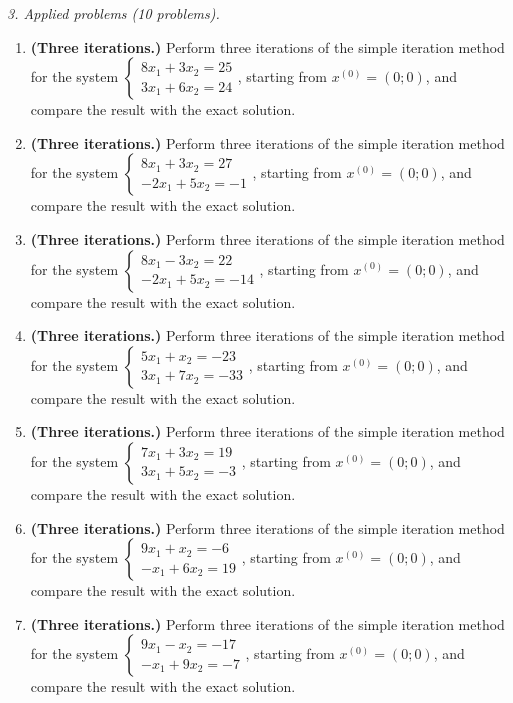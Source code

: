 \emph{3. Applied problems (10 problems).}
\bigskip
\begin{enumerate}[label=\arabic*., leftmargin=*]
\item \textbf{(Three iterations.)} Perform three iterations of the simple iteration method for the system $\begin{cases}8x_1+3x_2=25\\3x_1+6x_2=24\end{cases}$, starting from $x^{(0)}=(0;0)$, and compare the result with the exact solution.
\item \textbf{(Three iterations.)} Perform three iterations of the simple iteration method for the system $\begin{cases}8x_1+3x_2=27\\-2x_1+5x_2=-1\end{cases}$, starting from $x^{(0)}=(0;0)$, and compare the result with the exact solution.
\item \textbf{(Three iterations.)} Perform three iterations of the simple iteration method for the system $\begin{cases}8x_1-3x_2=22\\-2x_1+5x_2=-14\end{cases}$, starting from $x^{(0)}=(0;0)$, and compare the result with the exact solution.
\item \textbf{(Three iterations.)} Perform three iterations of the simple iteration method for the system $\begin{cases}5x_1+x_2=-23\\3x_1+7x_2=-33\end{cases}$, starting from $x^{(0)}=(0;0)$, and compare the result with the exact solution.
\item \textbf{(Three iterations.)} Perform three iterations of the simple iteration method for the system $\begin{cases}7x_1+3x_2=19\\3x_1+5x_2=-3\end{cases}$, starting from $x^{(0)}=(0;0)$, and compare the result with the exact solution.
\item \textbf{(Three iterations.)} Perform three iterations of the simple iteration method for the system $\begin{cases}9x_1+x_2=-6\\-x_1+6x_2=19\end{cases}$, starting from $x^{(0)}=(0;0)$, and compare the result with the exact solution.
\item \textbf{(Three iterations.)} Perform three iterations of the simple iteration method for the system $\begin{cases}9x_1-x_2=-17\\-x_1+9x_2=-7\end{cases}$, starting from $x^{(0)}=(0;0)$, and compare the result with the exact solution.

\end{enumerate}
